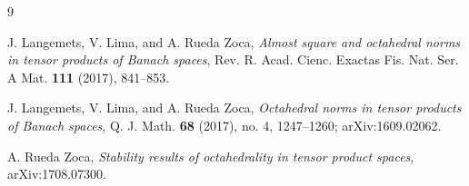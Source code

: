 \documentclass[11pt]{article}
\begin{document}
\begin{thebibliography}{9}

J. Langemets, V. Lima, and A. Rueda Zoca,
\emph{Almost square and octahedral norms in tensor products of Banach spaces},
Rev. R. Acad. Cienc. Exactas Fis. Nat. Ser. A Mat. \textbf{111} (2017),
841--853.

J. Langemets, V. Lima, and A. Rueda Zoca,
\emph{Octahedral norms in tensor products of Banach spaces},
Q. J. Math. \textbf{68} (2017), no. 4, 1247--1260; arXiv:1609.02062.

A. Rueda Zoca,
\emph{Stability results of octahedrality in tensor product spaces},
arXiv:1708.07300.

\end{thebibliography}
\end{document}
